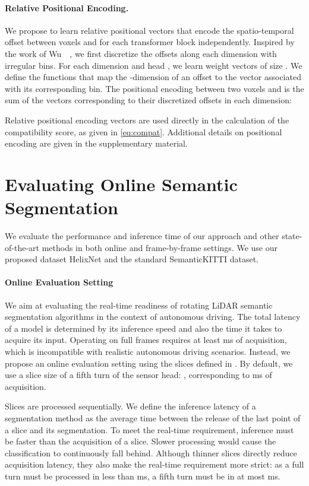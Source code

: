 \documentclass[runningheads]{tpls/llncs}
\begin{document}
\paragraph{Relative Positional Encoding.} We propose to learn relative positional vectors  that encode the spatio-temporal offset  between voxels  and  for each transformer block  independently. Inspired by the work of Wu~\etal~\cite{wu2021rethinking}, we first discretize the offsets along each dimension  with  irregular bins. For each dimension  and head , we learn  weight vectors of size . We define the functions  that map the -dimension of an offset to the vector associated with its corresponding bin. The positional encoding between two voxels  and  is the sum of the vectors corresponding to their discretized offsets in each dimension:

Relative positional encoding vectors are used directly in the calculation of the compatibility score, as given in \eqref{eq:compat}.
Additional details on positional encoding are given in the supplementary material.%
 \section{Evaluating Online Semantic Segmentation}\label{sec:experiments}
We evaluate the performance and inference time of our approach and other state-of-the-art methods in both online and frame-by-frame settings. We use our proposed dataset HelixNet and the standard SemanticKITTI dataset.

\paragraph{Online Evaluation Setting}
We aim at evaluating the real-time readiness of rotating LiDAR semantic segmentation algorithms in the context of autonomous driving. The total latency of a model is determined by its inference speed and also the time it takes to acquire its input. Operating on full frames requires at least ms of acquisition, which is incompatible with realistic autonomous driving scenarios. Instead, we propose an online evaluation setting using the slices defined in . By default, we use a slice size of a fifth turn of the sensor head: , corresponding to ms of acquisition.

Slices are processed sequentially. We define the inference latency of a segmentation method as the average time between the release of the last point of a slice and its segmentation. To meet the real-time requirement, inference must be faster than the acquisition of a slice. Slower processing would cause the classification to continuously fall behind.
Although thinner slices directly reduce acquisition latency, they also make the real-time requirement more strict: as a full turn must be processed in less than ms, a fifth turn must be in at most ms.
\end{document}
